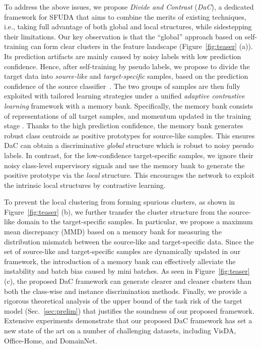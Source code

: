 \documentclass{article}
\newcommand{\modelName}{DaC}
\newcommand{\methodName}{Divide and Contrast}
\begin{document}
To address the above issues, we propose \textit{\methodName{}} (\textit{\modelName{}}), a dedicated framework for SFUDA that aims to combine the merits of existing techniques, i.e., taking full advantage of both global and local structures, while sidestepping their limitations.
Our key observation is that the ``global'' approach based on self-training can form clear clusters in the feature landscape (Figure~\ref{fig:teaser} (a)).
Its prediction artifacts are mainly caused by noisy labels with low prediction confidence.
Hence, after self-training by pseudo labels, we propose to divide the target data into \textit{source-like} and \textit{target-specific} samples, based on the prediction confidence of the source classifier~\cite{shot}.
The two groups of samples are then fully exploited with tailored learning strategies under a unified \textit{adaptive contrastive learning} framework with a memory bank. Specifically, the memory bank consists of representations of all target samples, and momentum updated in the training stage \cite{Qiu2021ijcai,nips2020spcl}. Thanks to the high prediction confidence, the memory bank generates robust class centroids as positive prototypes for source-like samples.  
This ensures \modelName{} can obtain a discriminative \textit{global} structure which is robust to noisy pseudo labels.
In contrast, for the low-confidence target-specific samples, we ignore their noisy class-level supervisory signals and use the memory bank to generate the positive prototype via the \textit{local} structure. This encourages the network to exploit the intrinsic local structures by contrastive learning.


To prevent the local clustering from forming spurious clusters, as shown in Figure~\ref{fig:teaser} (b), we further transfer the cluster structure from the source-like domain to the target-specific samples. 
In particular, we propose a maximum mean discrepancy (MMD) based on a memory bank for measuring the distribution mismatch between the source-like and target-specific data.
Since the set of source-like and target-specific samples are dynamically updated in our framework, the introduction of a memory bank can effectively alleviate the instability and batch bias caused by mini batches.
As seen in Figure~\ref{fig:teaser} (c), the proposed \modelName{} framework can generate clearer and cleaner clusters than both the class-wise and instance discrimination methods.
Finally, we provide a rigorous theoretical analysis of the upper bound of the task risk of the target model (Sec.~\ref{sec:prelim}) that justifies the soundness of our proposed framework.
Extensive experiments demonstrate that our proposed \modelName{} framework has set a new state of the art on a number of challenging datasets, including VisDA, Office-Home, and DomainNet.
\end{document}
